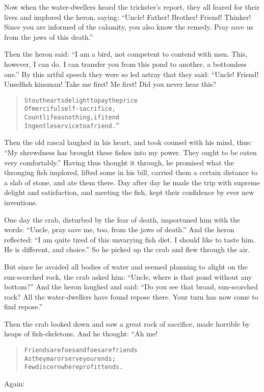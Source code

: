 \documentclass[article, twoside, 14pt]{memoir}
\renewenvironment{verbatim}{%
\begin{quote}%
\vskip -10pt%
\begin{alltt}\normalfont\large}{\end{alltt}%
\end{quote}%
\vskip -10pt
} %
\begin{document}
Now when the water-dwellers heard the trickster's report, they all
feared for their lives and implored the heron, saying:
``Uncle! Father! Brother! Friend! Thinker! Since you are informed of the calamity, you also know the remedy. Pray save us from the jaws of this death.''

Then the heron said:
``I am a bird, not competent to contend with men. This, however, I can do. I can transfer you from this pond to another, a bottomless one.''
By this artful speech they were so led astray that they said:
“Uncle! Friend! Unselfish kinsman! Take me first! Me first! Did you
never hear this?

\begin{verbatim}
Stout hearts delight to pay the price
Of merciful self-sacrifice,
Count life as nothing, if it end
In gentle service to a friend.”
\end{verbatim}
Then the old rascal laughed in his heart, and took counsel with his
mind, thus:
``My shrewdness has brought these fishes into my power. They ought to be eaten very comfortably.''
Having thus thought it through, he promised what the thronging fish
implored, lifted some in his bill, carried them a certain
distance to a slab of stone, and ate them there. Day after day he
made the trip with supreme delight and satisfaction, and meeting
the fish, kept their confidence by ever new inventions.

One day the crab, disturbed by the fear of death, importuned him
with the words:
``Uncle, pray save me, too, from the jaws of death.'' And the heron
reflected:
``I am quite tired of this unvarying fish diet. I should like to taste him. He is different, and choice.''
So he picked up the crab and flew through the air.

But since he avoided all bodies of water and seemed planning to
alight on the sun-scorched rock, the crab asked him:
``Uncle, where is that pond without any bottom?'' And the heron
laughed and said:
``Do you see that broad, sun-scorched rock? All the water-dwellers have found repose there. Your turn has now come to find repose.''

Then the crab looked down and saw a great rock of sacrifice, made
horrible by heaps of fish-skeletons. And he thought: “Ah me!

\begin{verbatim}
Friends are foes and foes are friends
As they mar or serve your ends;
Few discern where profit tends.
\end{verbatim}
Again:
\end{document}
